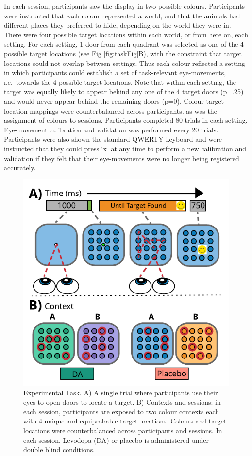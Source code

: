 \documentclass{article}
\begin{document}
In each session, participants saw the display in two possible colours.
Participants were instructed that each colour represented a world, and
that the animals had different places they preferred to hide, depending
on the world they were in. There were four possible target locations
within each world, or from here on, each setting. For each setting, 1
door from each quadrant was selected as one of the 4 possible target
locations (see Fig \ref{fig:taskFig}B), with the constraint that target
locations could not overlap between settings. Thus each colour reflected
a setting in which participants could establish a set of task-relevant
eye-movements, i.e.~towards the 4 possible target locations. Note that
within each setting, the target was equally likely to appear behind any
one of the 4 target doors (p=.25) and would never appear behind the
remaining doors (p=0). Colour-target location mappings were
counterbalanced across participants, as was the assignment of colours to
sessions. Participants completed 80 trials in each setting. Eye-movement
calibration and validation was performed every 20 trials. Participants
were also shown the standard QWERTY keyboard and were instructed that
they could press `x' at any time to perform a new calibration and
validation if they felt that their eye-movements were no longer being
registered accurately.

\begin{figure}

{\centering \includegraphics[width=0.7\linewidth]{../../images/DA_ExpTask} 

}

\caption{Experimental Task. A) A single trial where participants use their eyes to open doors to locate a target. B) Contexts and sessions: in each session, participants are exposed to two colour contexts each with 4 unique and equiprobable target locations. Colours and target locations were counterbalanced across participants and sessions. In each session, Levodopa (DA) or placebo is administered under double blind conditions.}\label{fig:taskfig}
\end{figure}
\end{document}
